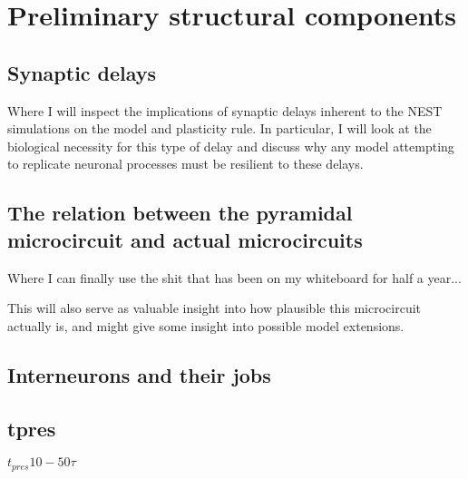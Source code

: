 \section{Preliminary structural components}

\subsection{Synaptic delays}

Where I will inspect the implications of synaptic delays inherent to the NEST simulations on the model and plasticity
rule. In particular, I will look at the biological necessity for this type of delay and discuss why any model attempting
to replicate neuronal processes must be resilient to these delays.


\subsection{The relation between the pyramidal microcircuit and actual microcircuits}

Where I can finally use the shit that has been on my whiteboard for half a year...

This will also serve as valuable insight into how plausible this microcircuit actually is, and might give some insight
into possible model extensions.

\subsection{Interneurons and their jobs}

\subsection{tpres}

$t_{pres} 10 - 50 \tau$
